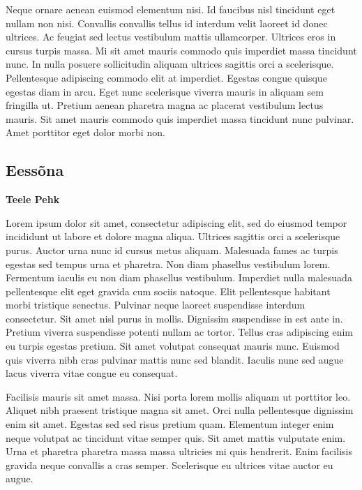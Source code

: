 \documentclass[estonian,]{article}
\begin{document}
Neque ornare aenean euismod elementum nisi. Id faucibus nisl tincidunt eget nullam non nisi. Convallis convallis tellus id interdum velit laoreet id donec ultrices. Ac feugiat sed lectus vestibulum mattis ullamcorper. Ultrices eros in cursus turpis massa. Mi sit amet mauris commodo quis imperdiet massa tincidunt nunc. In nulla posuere sollicitudin aliquam ultrices sagittis orci a scelerisque. Pellentesque adipiscing commodo elit at imperdiet. Egestas congue quisque egestas diam in arcu. Eget nunc scelerisque viverra mauris in aliquam sem fringilla ut. Pretium aenean pharetra magna ac placerat vestibulum lectus mauris. Sit amet mauris commodo quis imperdiet massa tincidunt nunc pulvinar. Amet porttitor eget dolor morbi non.

\hypertarget{eessuxf5na}{%
\subsection*{Eessõna}\label{eessuxf5na}}

\begin{authors}
\textbf{Teele Pehk}
\end{authors}

Lorem ipsum dolor sit amet, consectetur adipiscing elit, sed do eiusmod tempor incididunt ut labore et dolore magna aliqua. Ultrices sagittis orci a scelerisque purus. Auctor urna nunc id cursus metus aliquam. Malesuada fames ac turpis egestas sed tempus urna et pharetra. Non diam phasellus vestibulum lorem. Fermentum iaculis eu non diam phasellus vestibulum. Imperdiet nulla malesuada pellentesque elit eget gravida cum sociis natoque. Elit pellentesque habitant morbi tristique senectus. Pulvinar neque laoreet suspendisse interdum consectetur. Sit amet nisl purus in mollis. Dignissim suspendisse in est ante in. Pretium viverra suspendisse potenti nullam ac tortor. Tellus cras adipiscing enim eu turpis egestas pretium. Sit amet volutpat consequat mauris nunc. Euismod quis viverra nibh cras pulvinar mattis nunc sed blandit. Iaculis nunc sed augue lacus viverra vitae congue eu consequat.

Facilisis mauris sit amet massa. Nisi porta lorem mollis aliquam ut porttitor leo. Aliquet nibh praesent tristique magna sit amet. Orci nulla pellentesque dignissim enim sit amet. Egestas sed sed risus pretium quam. Elementum integer enim neque volutpat ac tincidunt vitae semper quis. Sit amet mattis vulputate enim. Urna et pharetra pharetra massa massa ultricies mi quis hendrerit. Enim facilisis gravida neque convallis a cras semper. Scelerisque eu ultrices vitae auctor eu augue.
\end{document}
